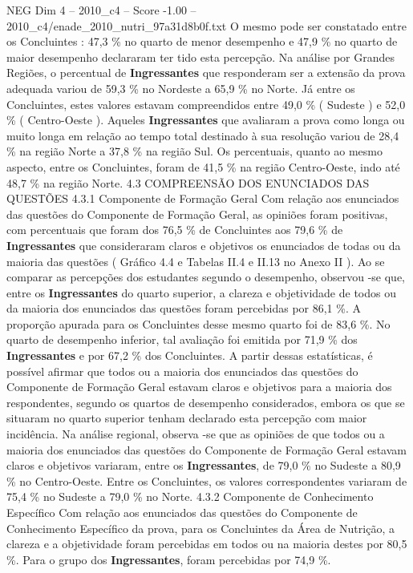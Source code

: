 \begin{textsample}{NEG Dim 4 – 2010\_c4 – Score -1.00 – 2010\_c4/enade\_2010\_nutri\_97a31d8b0f.txt}
O mesmo pode ser constatado entre os Concluintes : 47,3 \% no quarto de menor desempenho e 47,9 \% no quarto de maior desempenho declararam ter tido esta percepção.
Na análise por Grandes Regiões, o percentual de \textbf{Ingressantes} que responderam ser a extensão da prova adequada variou de 59,3 \% no Nordeste a 65,9 \% no Norte.
Já entre os Concluintes, estes valores estavam compreendidos entre 49,0 \% ( Sudeste ) e 52,0 \% ( Centro-Oeste ).
Aqueles \textbf{Ingressantes} que avaliaram a prova como longa ou muito longa em relação ao tempo total destinado à sua resolução variou de 28,4 \% na região Norte a 37,8 \% na região Sul.
Os percentuais, quanto ao mesmo aspecto, entre os Concluintes, foram de 41,5 \% na região Centro-Oeste, indo até 48,7 \% na região Norte. 4.3 COMPREENSÃO DOS ENUNCIADOS DAS QUESTÕES 4.3.1 Componente de Formação Geral Com relação aos enunciados das questões do Componente de Formação Geral, as opiniões foram positivas, com percentuais que foram dos 76,5 \% de Concluintes aos 79,6 \% de \textbf{Ingressantes} que consideraram claros e objetivos os enunciados de todas ou da maioria das questões ( Gráfico 4.4 e Tabelas II.4 e II.13 no Anexo II ).
Ao se comparar as percepções dos estudantes segundo o desempenho, observou -se que, entre os \textbf{Ingressantes} do quarto superior, a clareza e objetividade de todos ou da maioria dos enunciados das questões foram percebidas por 86,1 \%.
A proporção apurada para os Concluintes desse mesmo quarto foi de 83,6 \%.
No quarto de desempenho inferior, tal avaliação foi emitida por 71,9 \% dos \textbf{Ingressantes} e por 67,2 \% dos Concluintes.
A partir dessas estatísticas, é possível afirmar que todos ou a maioria dos enunciados das questões do Componente de Formação Geral estavam claros e objetivos para a maioria dos respondentes, segundo os quartos de desempenho considerados, embora os que se situaram no quarto superior tenham declarado esta percepção com maior incidência.
Na análise regional, observa -se que as opiniões de que todos ou a maioria dos enunciados das questões do Componente de Formação Geral estavam claros e objetivos variaram, entre os \textbf{Ingressantes}, de 79,0 \% no Sudeste a 80,9 \% no Centro-Oeste.
Entre os Concluintes, os valores correspondentes variaram de 75,4 \% no Sudeste a 79,0 \% no Norte. 4.3.2 Componente de Conhecimento Específico Com relação aos enunciados das questões do Componente de Conhecimento Específico da prova, para os Concluintes da Área de Nutrição, a clareza e a objetividade foram percebidas em todos ou na maioria destes por 80,5 \%.
Para o grupo dos \textbf{Ingressantes}, foram percebidas por 74,9 \%.

\end{textsample}
